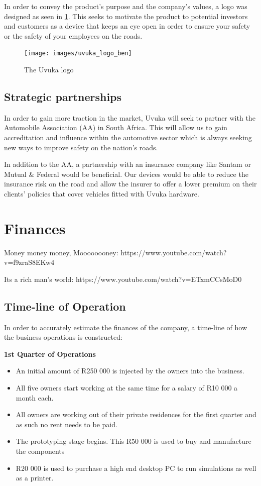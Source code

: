 In order to convey the product's purpose and the company's values, a logo was designed as seen in \cref{fig:uvuka_logo}. This seeks to motivate the product to potential investors and customers as a device that keeps an eye open in order to ensure your safety or the safety of your employees on the roads.

\begin{figure}[H]
\centering
\texttt{[image: images/uvuka\_logo\_ben]}
\vskip10pt
\caption[The Uvuka logo]{The Uvuka logo}
\label{fig:uvuka_logo}
\end{figure}

\section{Strategic partnerships}
In order to gain more traction in the market, Uvuka will seek to partner with the Automobile Association (AA) in South Africa. This will allow us to gain accreditation and influence within the automotive sector which is always seeking new ways to improve safety on the nation's roads.

In addition to the AA, a partnership with an insurance company like Santam or Mutual \& Federal would be beneficial. Our devices would be able to reduce the insurance risk on the road and allow the insurer to offer a lower premium on their clients' policies that cover vehicles fitted with Uvuka hardware.

\newpage

\chapter{Finances}

Money money money, Moooooooney: https://www.youtube.com/watch?v=f9zraS8EKw4 

Its a rich man's world: https://www.youtube.com/watch?v=ETxmCCsMoD0

\section{Time-line of Operation}
In order to accurately estimate the finances of the company, a time-line of how the business operations is constructed:

{\bfseries 1st Quarter of Operations}
\begin{itemize}
\item An initial amount of R250 000 is injected by the owners into the business.
\item All five owners start working at the same time for a salary of R10 000 a month each.
\item All owners are working out of their private residences for the first quarter and as such no rent needs to be paid.
\item The prototyping stage begins. This R50 000 is used to buy and manufacture the components
\item R20 000 is used to purchase a high end desktop PC to run simulations as well as a printer.
\end{itemize}


